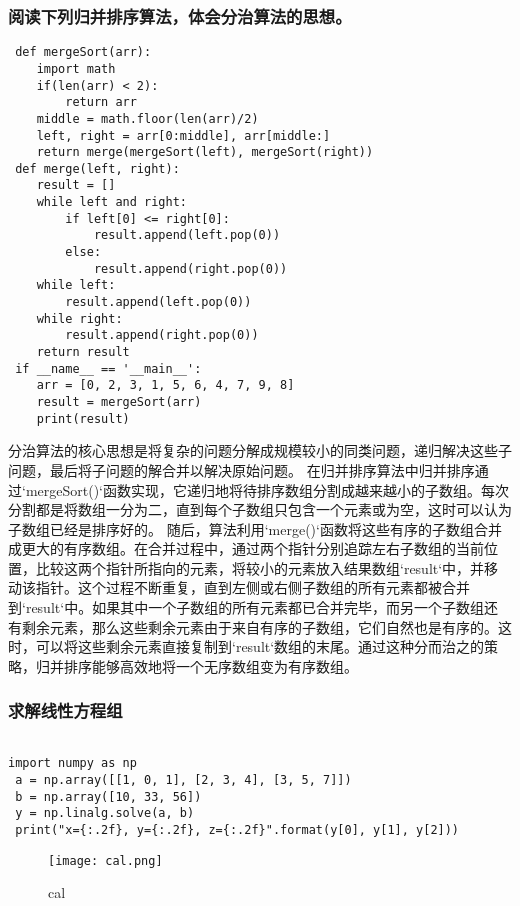 \documentclass{ctexart}
\begin{document}
\subsubsection{阅读下列归并排序算法，体会分治算法的思想。}

\begin{lstlisting}
 def mergeSort(arr):
    import math
    if(len(arr) < 2):
        return arr
    middle = math.floor(len(arr)/2)
    left, right = arr[0:middle], arr[middle:]
    return merge(mergeSort(left), mergeSort(right))
 def merge(left, right):
    result = []
    while left and right:
        if left[0] <= right[0]:
            result.append(left.pop(0))
        else:
            result.append(right.pop(0))
    while left:
        result.append(left.pop(0))
    while right:
        result.append(right.pop(0))
    return result
 if __name__ == '__main__':
    arr = [0, 2, 3, 1, 5, 6, 4, 7, 9, 8]
    result = mergeSort(arr)
    print(result)
\end{lstlisting}
分治算法的核心思想是将复杂的问题分解成规模较小的同类问题，递归解决这些子问题，最后将子问题的解合并以解决原始问题。
在归并排序算法中归并排序通过`mergeSort()`函数实现，它递归地将待排序数组分割成越来越小的子数组。每次分割都是将数组一分为二，直到每个子数组只包含一个元素或为空，这时可以认为子数组已经是排序好的。
随后，算法利用`merge()`函数将这些有序的子数组合并成更大的有序数组。在合并过程中，通过两个指针分别追踪左右子数组的当前位置，比较这两个指针所指向的元素，将较小的元素放入结果数组`result`中，并移动该指针。这个过程不断重复，直到左侧或右侧子数组的所有元素都被合并到`result`中。如果其中一个子数组的所有元素都已合并完毕，而另一个子数组还有剩余元素，那么这些剩余元素由于来自有序的子数组，它们自然也是有序的。这时，可以将这些剩余元素直接复制到`result`数组的末尾。通过这种分而治之的策略，归并排序能够高效地将一个无序数组变为有序数组。



\subsubsection{求解线性方程组}

\begin{lstlisting}

import numpy as np
 a = np.array([[1, 0, 1], [2, 3, 4], [3, 5, 7]])
 b = np.array([10, 33, 56])
 y = np.linalg.solve(a, b)
 print("x={:.2f}, y={:.2f}, z={:.2f}".format(y[0], y[1], y[2]))
\end{lstlisting}

\begin{figure}[H]
    \centering
    \texttt{[image: cal.png]}
    \caption{cal}
    \label{fig:enter-label}
\end{figure}
\end{document}
